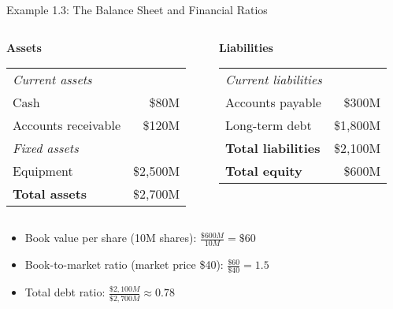 \documentclass[10pt,handout]{beamer}
\begin{document}
\begin{frame}{Example 1.3: The Balance Sheet and Financial Ratios}
    \small
    \begin{columns}
      \begin{column}{0.48\textwidth}
        \textbf{Assets} \vspace{0.2em}\\
        \begin{tabular}{lr}
          \multicolumn{2}{l}{\textit{Current assets}} \\
          Cash & \$80M \\
          Accounts receivable & \$120M \\[0.5em]
          \multicolumn{2}{l}{\textit{Fixed assets}} \\
          Equipment & \$2,500M \\[0.5em]
          \textbf{Total assets} & \$2,700M \\
        \end{tabular}
      \end{column}
      \begin{column}{0.48\textwidth}
        \textbf{Liabilities} \vspace{0.2em}\\
        \begin{tabular}{lr}
          \multicolumn{2}{l}{\textit{Current liabilities}} \\
          Accounts payable & \$300M \\[0.5em]
          Long-term debt & \$1,800M \\[1.5em]
          \textbf{Total liabilities} & \$2,100M \\
          \textbf{Total equity} & \$600M \\
        \end{tabular}
      \end{column}
    \end{columns}
    
    \pause
    \begin{itemize}
      \item Book value per share (10M shares): $\tfrac{\$600M}{10M} = \$60$
      \item Book-to-market ratio (market price \$40): $\tfrac{\$60}{\$40} = 1.5$
      \item Total debt ratio: $\tfrac{\$2,100M}{\$2,700M} \approx 0.78$
    \end{itemize}
\end{frame}
\end{document}
